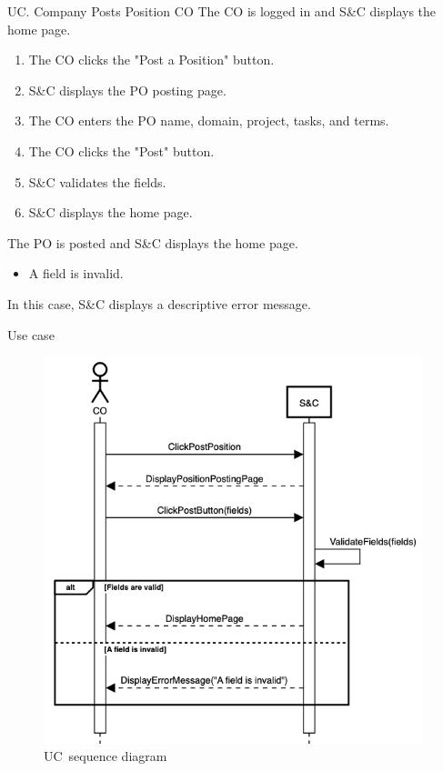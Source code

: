 \clearpage
\begin{usecase}
    {UC\theuc. Company Posts Position}
    {CO}
    {The CO is logged in and S\&C displays the home page.}
    {\begin{enumerate}[leftmargin=*]
        \item The CO clicks the "Post a Position" button.
        \item S\&C displays the PO posting page.
        \item The CO enters the PO name, domain, project, tasks, and terms.
        \item The CO clicks the "Post" button.
        \item S\&C validates the fields.
        \item S\&C displays the home page.
    \end{enumerate}}
    {The PO is posted and S\&C displays the home page.}
    {\begin{itemize}[leftmargin=*, label=\tiny\textbullet]
        \item A field is invalid.
    \end{itemize}
    In this case, S\&C displays a descriptive error message.}
    {Use case \theuc}
\end{usecase}

\begin{figure}
    \centering
    \includegraphics[width=11cm]{images/sequence-diagrams/company-posts-position.png}
    \caption{UC\theuc\ sequence diagram}
\end{figure}

